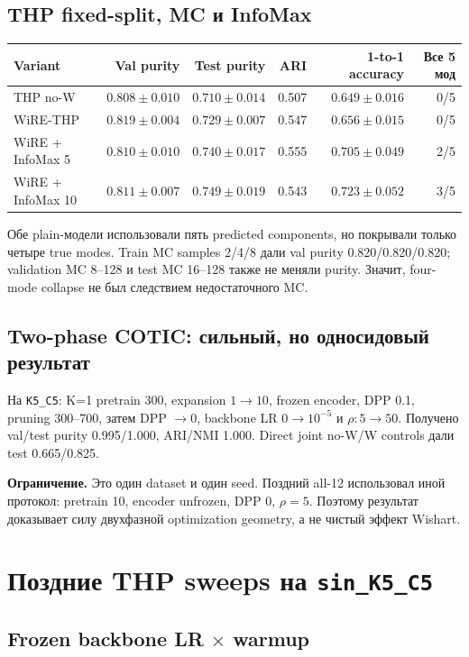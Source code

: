 \documentclass[11pt,a4paper]{article}
\newcommand{\code}[1]{\texttt{#1}}
\newcommand{\boxnote}[2]{%
  \begin{center}\setlength{\fboxsep}{9pt}%
  \colorbox{#1}{\begin{minipage}{0.94\textwidth}\raggedright #2\par\end{minipage}}
  \end{center}}
\newcommand{\caveat}[1]{\boxnote{lightamber}{\textbf{Ограничение.} #1}}
\begin{document}
\subsection{THP fixed-split, MC и InfoMax}

\begin{center}
\small
\begin{tabular}{lrrrrr}
\toprule
Variant & Val purity & Test purity & ARI & 1-to-1 accuracy & Все 5 мод \\
\midrule
THP no-W & $0.808\pm0.010$ & $0.710\pm0.014$ & 0.507 & $0.649\pm0.016$ & 0/5 \\
WiRE-THP & $0.819\pm0.004$ & $0.729\pm0.007$ & 0.547 & $0.656\pm0.015$ & 0/5 \\
WiRE + InfoMax 5 & $0.810\pm0.010$ & $0.740\pm0.017$ & 0.555 & $0.705\pm0.049$ & 2/5 \\
WiRE + InfoMax 10 & $0.811\pm0.007$ & $0.749\pm0.019$ & 0.543 & $0.723\pm0.052$ & 3/5 \\
\bottomrule
\end{tabular}
\end{center}

Обе plain-модели использовали пять predicted components, но покрывали только
четыре true modes. Train MC samples 2/4/8 дали val purity 0.820/0.820/0.820;
validation MC 8--128 и test MC 16--128 также не меняли purity. Значит,
four-mode collapse не был следствием недостаточного MC.

\subsection{Two-phase COTIC: сильный, но односидовый результат}

На \code{K5\_C5}: K=1 pretrain 300, expansion $1\to10$, frozen encoder,
DPP 0.1, pruning 300--700, затем DPP $\to0$, backbone LR $0\to10^{-5}$ и
$\rho:5\to50$. Получено val/test purity 0.995/1.000, ARI/NMI 1.000. Direct
joint no-W/W controls дали test 0.665/0.825.

\caveat{Это один dataset и один seed. Поздний all-12 использовал иной протокол:
pretrain 10, encoder unfrozen, DPP 0, $\rho=5$. Поэтому результат доказывает
силу двухфазной optimization geometry, а не чистый эффект Wishart.}

\section{Поздние THP sweeps на \code{sin\_K5\_C5}}

\subsection{Frozen backbone LR \texorpdfstring{$\times$}{x} warmup}
\end{document}
